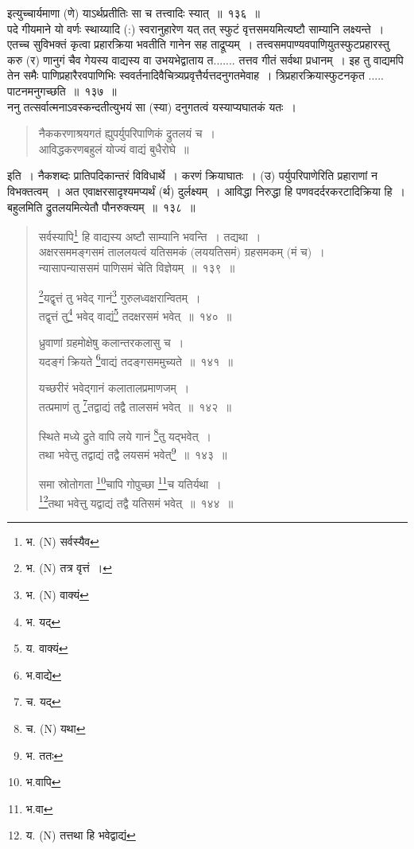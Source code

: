 \documentclass[11pt, openany]{book}
\begin{document}
\noindent
इत्युच्चार्यमाणा (णे) याऽर्थप्रतीतिः सा च तत्त्वादिः स्यात्~॥~१३६~॥\\

पदे गीयमाने यो वर्णः स्थाय्यादि (:) स्वरानुहारेण यत् तत् स्फुटं वृत्तसमयमित्यष्टौ साम्यानि लक्ष्यन्ते~। एतच्च सुविभक्तं कृत्वा प्रहारक्रिया भवतीति गानेन सह ताद्रूप्यम्~। तत्त्वसमपाण्यवपाणियुतस्फुटप्रहारस्तु करु (र) णानुगं चैव गेयस्य वाद्यस्य वा उभयभेद्वाताय त....... तत्तव गीतं सर्वथा प्रधानम्~। इह तु वाद्यमपि तेन समैः पाणिप्रहारैरवपाणिभिः स्ववर्तनादिवैचित्र्यप्रवृत्तैर्यत्तदनुगतमेवाह~। त्रिप्रहारक्रियास्फुटनकृत  ..... पाटनमनुगच्छति~॥~१३७~॥\\

ननु तत्सर्वात्मनाऽवस्कन्दतीत्युभयं सा (स्या) दनुगतत्वं यस्याप्यघातकं यतः~। 

\begin{quote}
{\qt नैककरणाश्रयगतं ह्युपर्युपरिपाणिकं द्रुतलयं च~।\\
 आविद्धकरणबहुलं योज्यं वाद्यं बुधैरोघे~॥}
\end{quote}
 
\noindent
इति~। नैकशब्दः प्रातिपदिकान्तरं विविधार्थे~। करणं क्रियाघातः~।  (उ) पर्युपरिपाणेरिति प्रहाराणां न विभक्तत्वम्~। अत एवाक्षरसादृश्यमप्यर्थं (र्थ) दुर्लक्ष्यम्~। आविद्धा निरुद्धा हि पणवदर्दरकरटादिक्रिया हि~। बहुलमिति द्रुतलयमित्येतौ पौनरुक्त्यम्~॥~१३८~॥

\newpage

\begin{quote}
{\na सर्वस्यापि\renewcommand{\thefootnote}{1}\footnote{भ. (N) सर्वस्यैव} हि वाद्यस्य अष्टौ साम्यानि भवन्ति~। तद्यथा~।\\
अक्षरसममङ्गसमं ताललयत्वं यतिसमकं (लययतिसमं) ग्रहसमकम् (मं च)~।\\
न्यासापन्याससमं पाणिसमं चेति विज्ञेयम्~॥~१३९~॥

\renewcommand{\thefootnote}{2}\footnote{भ. (N) तत्र वृत्तं~।}यद्वृत्तं तु भवेद् गानं\renewcommand{\thefootnote}{3}\footnote{भ. (N) वाक्यं} गुरुलध्वक्षरान्वितम्~।\\
तद्वृत्तं तु\renewcommand{\thefootnote}{4}\footnote{भ. यद्} भवेद् वाद्यं\renewcommand{\thefootnote}{5}\footnote{य. वाक्यं} तदक्षरसमं भवेत्~॥~१४०~॥

ध्रुवाणां ग्रहमोक्षेषु कलान्तरकलासु च~।\\
यदङ्गं क्रियते \renewcommand{\thefootnote}{6}\footnote{भ.वाद्ये}वाद्यं तदङ्गसममुच्यते~॥~१४१~॥

यच्छरीरं भवेद्गानं कलातालप्रमाणजम्~।\\
तत्प्रमाणं तु \renewcommand{\thefootnote}{7}\footnote{च. यद्}तद्वाद्यं तद्वै तालसमं भवेत्~॥~१४२~॥

स्थिते मध्ये द्रुते वापि लये गानं \renewcommand{\thefootnote}{8}\footnote{च. (N) यथा}तु यद्भवेत्~।\\
तथा भवेत्तु तद्वाद्यं तद्वै लयसमं भवेत्\renewcommand{\thefootnote}{9}\footnote{भ. ततः}~॥~१४३~॥

समा स्रोतोगता \renewcommand{\thefootnote}{10}\footnote{भ.वापि}चापि गोपुच्छा \renewcommand{\thefootnote}{11}\footnote{भ.वा}च यतिर्यथा~।\\
\renewcommand{\thefootnote}{12}\footnote{य. (N) तत्तथा हि भवेद्वाद्यं}तथा भवेत्तु यद्वाद्यं तद्वै यतिसमं भवेत्~॥~१४४~॥}
\end{quote}
\end{document}
